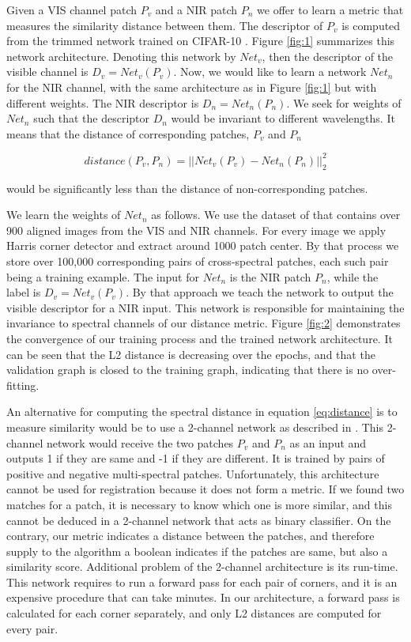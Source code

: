 \documentclass[10pt,twocolumn,letterpaper]{article}
\begin{document}
Given a VIS channel patch $P_v$ and a NIR patch $P_n$ we offer to learn a metric that measures the similarity distance between them. The descriptor of $P_v$ is computed from the trimmed network trained on CIFAR-10 \cite{krizhevsky2009learning}. Figure \ref{fig:1} summarizes this network architecture. Denoting this network by $Net_v$, then the descriptor of the visible channel is $D_v = Net_v(P_v)$. Now, we would like to learn a network $Net_n$ for the NIR channel, with the same architecture as in Figure \ref{fig:1} but with different weights. The NIR descriptor is $D_n = Net_n(P_n)$. We seek for weights of $Net_n$ such that the descriptor $D_n$ would be invariant to different wavelengths. It means that the distance of corresponding patches, $P_v$ and $P_n$

\begin{equation} \label{eq:distance}
distance(P_v,P_n) = || Net_v(P_v)-Net_n(P_n)||_2^2
\end{equation}

would be significantly less than the distance of non-corresponding patches.

We learn the weights of $Net_n$ as follows. We use the dataset of \cite{multiSpectralSIFT} that contains over 900 aligned images from the VIS and NIR channels. For every image we apply Harris corner detector \cite{harris} and extract around 1000 patch center. By that process we store over 100,000 corresponding pairs of cross-spectral patches, each such pair being a training example. The input for $Net_n$ is the NIR patch $P_n$, while the label is $D_v = Net_v(P_v)$. By that approach we teach the network to output the visible descriptor for a NIR input. This network is responsible for maintaining the invariance to spectral channels of our distance metric. Figure \ref{fig:2} demonstrates the convergence of our training process and the trained network architecture. It can be seen that the L2 distance is decreasing over the epochs, and that the validation graph is closed to the training graph, indicating that there is no over-fitting.

An alternative for computing the spectral distance in equation \eqref{eq:distance} is to measure similarity would be to use a 2-channel network as described in \cite{aguilera2016learning}. This 2-channel network would receive the two patches $P_v$ and $P_n$ as an input and outputs 1 if they are same and -1 if they are different. It is trained by pairs of positive and negative multi-spectral patches. Unfortunately, this architecture cannot be used for registration because it does not form a metric. If we found two matches for a patch, it is necessary to know which one is more similar, and this cannot be deduced in a 2-channel network that acts as binary classifier. On the contrary, our metric indicates a distance between the patches, and therefore supply to the algorithm a boolean indicates if the patches are same, but also a similarity score. Additional problem of the 2-channel architecture is its run-time. This network requires to run a forward pass for each pair of corners, and it is an expensive procedure that can take minutes. In our architecture, a forward pass is calculated for each corner separately, and only L2 distances are computed for every pair. 
\end{document}
